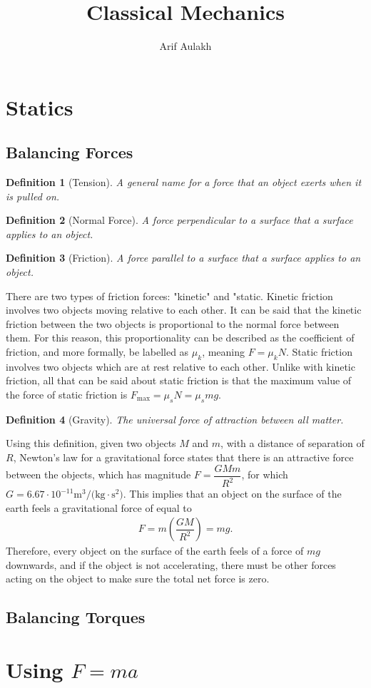 \documentclass{article}
\title{Classical Mechanics}
\author{Arif Aulakh}
\date{}
\theoremstyle{plain}
\newtheorem{definition}{Definition}
\begin{document}
\maketitle

\section{Statics}
\subsection{Balancing Forces}
\begin{definition}[Tension]
A general name for a force that an object exerts when it is pulled on. 
\end{definition}

\begin{definition}[Normal Force]
A force perpendicular to a surface that a surface applies to an object. 
\end{definition}

\begin{definition}[Friction]
A force parallel to a surface that a surface applies to an object. 
\end{definition}
There are two types of friction forces: "kinetic" and "static. Kinetic friction involves two objects moving relative to each other. It can be said that the kinetic friction between the two objects is proportional to the normal force between them. For this reason, this proportionality can be described as the coefficient of friction, and more formally, be labelled as $\mu_k$, meaning $F = \mu_kN$. Static friction involves two objects which are at rest relative to each other. Unlike with kinetic friction, all that can be said about static friction is that the maximum value of the force of static friction is $F_{\text{max}} = \mu_sN = \mu_smg$.
\begin{definition}[Gravity]
The universal force of attraction between all matter. 
\end{definition}

Using this definition, given two objects $M$ and $m$, with a distance of separation of $R$, Newton's law for a gravitational force states that there is an attractive force between the objects, which has magnitude $F = \dfrac{GMm}{R^2}$, for which $\si{G = 6.67 \cdot 10^{-11} \meter^3/(\kilogram \cdot \second^2)}$. This implies that an object on the surface of the earth feels a gravitational force of equal to
\begin{align*}
    F = m \left(\dfrac{GM}{R^2} \right) = mg.
\end{align*}
Therefore, every object on the surface of the earth feels of a force of $mg$ downwards, and if the object is not accelerating, there must be other forces acting on the object to make sure the total net force is zero. 
\subsection{Balancing Torques}

\section{Using $F = ma$}
\end{document}
